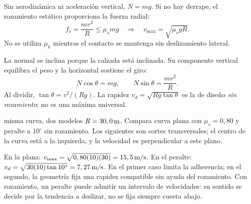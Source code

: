 \documentclass[11pt,a4paper]{article}
\begin{document}
Sin aerodin\'amica ni aceleraci\'on vertical, $N=mg$. Si no hay derrape,
el rozamiento est\'atico proporciona la fuerza radial:
\[
f_s=\frac{mv^2}{R}\le\mu_smg
\quad\Rightarrow\quad v_{\max}=\sqrt{\mu_sgR}.
\]
No se utiliza $\mu_k$ mientras el contacto se mantenga sin deslizamiento lateral.

La normal se inclina porque la calzada est\'a inclinada. Su componente vertical
equilibra el peso y la horizontal sostiene el giro:
\[
N\cos\theta=mg,\qquad N\sin\theta=\frac{mv^2}{R}.
\]
Al dividir, $\tan\theta=v^2/(Rg)$.
La rapidez $v_d=\sqrt{Rg\tan\theta}$ es la de dise\~no \emph{sin rozamiento};
no es una m\'axima universal.

\begin{examplebox}{misma curva, dos modelos}
 $R=30,0\,\mathrm{m}$. Compara curva plana con $\mu_s=0,80$
y peralte a $10^\circ$ sin rozamiento.
\solutionblock
{} Los siguientes son cortes transversales; el centro de la curva
est\'a a la izquierda, y la velocidad es perpendicular a este plano.
\begin{center}
\end{center}
 En la plana:
$v_{\max}=\sqrt{0,80(10)(30)}=15,5\,\mathrm{m/s}$.
En el peralte:
$v_d=\sqrt{30(10)\tan10^\circ}=7,27\,\mathrm{m/s}$.
 En el primer caso limita la adherencia; en el segundo,
la geometr\'ia fija una rapidez compatible sin ayuda del rozamiento.
Con rozamiento, un peralte puede admitir un intervalo de velocidades:
su sentido se decide por la tendencia a deslizar, no se fija siempre cuesta abajo.
\end{examplebox}
\end{document}
